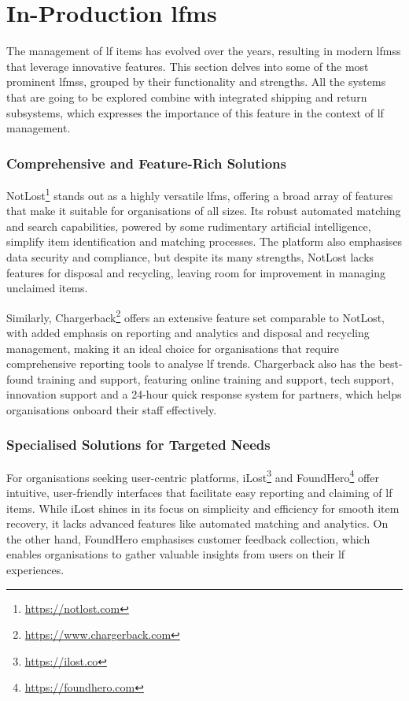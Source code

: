 \section{In-Production \acl{lfms}} \label{sec:in-production-solutions}

The management of \ac{lf} items has evolved over the years, resulting in modern \acp{lfms} that leverage innovative features. This section delves into some of the most prominent \acp{lfms}, grouped by their functionality and strengths. All the systems that are going to be explored combine with integrated shipping and return subsystems, which expresses the importance of this feature in the context of \ac{lf} management.

\subsubsection{Comprehensive and Feature-Rich Solutions} \label{subsubsec:comprehensive-solutions}

NotLost\footnote{\url{https://notlost.com}} stands out as a highly versatile \ac{lfms}, offering a broad array of features that make it suitable for organisations of all sizes. Its robust automated matching and search capabilities, powered by some rudimentary artificial intelligence, simplify item identification and matching processes. The platform also emphasises data security and compliance, but despite its many strengths, NotLost lacks features for disposal and recycling, leaving room for improvement in managing unclaimed items.

Similarly, Chargerback\footnote{\url{https://www.chargerback.com}} offers an extensive feature set comparable to NotLost, with added emphasis on reporting and analytics and disposal and recycling management, making it an ideal choice for organisations that require comprehensive reporting tools to analyse \ac{lf} trends. Chargerback also has the best-found training and support, featuring online training and support, tech support, innovation support and a 24-hour quick response system for partners, which helps organisations onboard their staff effectively.

\subsubsection{Specialised Solutions for Targeted Needs} \label{subsubsec:specialised-solutions}

For organisations seeking user-centric platforms, iLost\footnote{\url{https://ilost.co}} and FoundHero\footnote{\url{https://foundhero.com}} offer intuitive, user-friendly interfaces that facilitate easy reporting and claiming of \ac{lf} items. While iLost shines in its focus on simplicity and efficiency for smooth item recovery, it lacks advanced features like automated matching and analytics. On the other hand, FoundHero emphasises customer feedback collection, which enables organisations to gather valuable insights from users on their \ac{lf} experiences.

